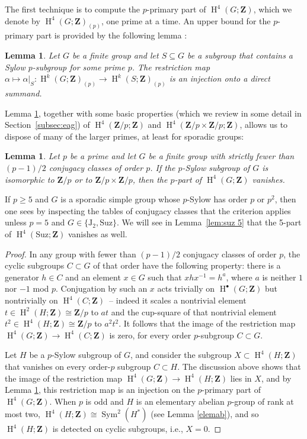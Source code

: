 \documentclass[pdftex]{sigma}
\numberwithin{equation}{section}
\newtheorem{Lemma}[Theorem]{Lemma}
\newcommand\bZ{\mathbf Z}
\DeclareMathOperator\homology{H}
\renewcommand\H{\homology}
\newcommand\<\langle
\renewcommand\>\rangle
\newcommand\Suz{\mathrm{Suz}}
\DeclareMathOperator\Sym{Sym}
\begin{document}
The first {technique is to compute}
 the $p$-primary part of $\H^4(G;\bZ)$, which we denote by $\H^4(G;\bZ)_{(p)}$, one prime at a time. An upper bound for the $p$-primary part is provided by the following lemma \cite[Section~XII.8]{MR0077480}:

\begin{Lemma}\label{transfer restriction}
Let $G$ be a finite group and let $S \subseteq G$ be a subgroup that contains a Sylow $p$-subgroup for some prime $p$. The {restriction} map $\alpha \mapsto \alpha|_S\colon \H^k(G;\bZ)_{(p)} \to \H^k(S;\bZ)_{(p)}$ is an injection onto a direct summand.
\end{Lemma}

Lemma \ref{transfer restriction}, together with some basic properties (which we review in some detail in Section~\ref{subsec:eag}) of $\H^4(\bZ/p;\bZ)$ and $\H^4(\bZ/p \times \bZ/p;\bZ)$, allows us to dispose of many of the larger primes, at least for sporadic groups:

\begin{Lemma}\label{large primes}Let $p$ be a prime and let $G$ be a finite group with strictly fewer than $(p-1)/2$ conjugacy classes of order $p$. If the $p$-Sylow subgroup of $G$ is isomorphic to $\bZ/p$ or to $\bZ/p \times \bZ/p$, then the $p$-part of $\H^4(G;\bZ)$ vanishes.
\end{Lemma}

If $p \geq 5$ and $G$ is a sporadic simple group whose $p$-Sylow has order $p$ or $p^2$, then one sees by inspecting the tables of conjugacy classes that the criterion applies unless $p = 5$ and $G \in \{\mathrm{J}_2,\mathrm{Suz}\}$. We will see in Lemma~\ref{lem:suz 5} that the 5-part of $\H^4(\Suz;\bZ)$ vanishes as well.

\begin{proof}In any group with fewer than $(p-1)/2$ conjugacy classes of order $p$, the cyclic subgroups $C \subset G$ of that order have the following property: there is a generator $h \in C$ and an element $x \in G$ such that $xhx^{-1} = h^a$, where $a$ is neither $1$ nor $-1$ mod $p$. Conjugation by such an $x$ acts trivially on $\H^\bullet(G;\bZ)$ but nontrivially on $\H^4(C;\bZ)$~-- indeed it scales a nontrivial element $t \in \H^2(H;\bZ) \cong \bZ/p$ to $at$ and the cup-square of that nontrivial element $t^2 \in \H^4(H;\bZ) \cong \bZ/p$ to $a^2 t^2$.
It follows that the image of the restriction map $\H^4(G;\bZ) \to \H^4(C;\bZ)$ is zero, for every order $p$-subgroup $C \subset G$.

Let $H$ be a $p$-Sylow subgroup of $G$, and consider the subgroup $X \subset \H^4(H;\bZ)$ that vanishes on every order-$p$ subgroup $C \subset H$. The discussion above shows that the image of the restriction map $\H^4(G;\bZ) \to \H^4(H;\bZ)$ lies in $X$, and by Lemma \ref{transfer restriction}, this restriction map is an injection on the $p$-primary part of $\H^4(G;\bZ)$. When $p$ is odd and $H$ is an elementary abelian $p$-group of rank at most two, $\H^4(H;\bZ) \cong \Sym^2(H^*)$ (see Lemma \ref{elemab}), and so $\H^4(H;\bZ)$ is detected on cyclic subgroups, i.e., $X = 0$.
\end{proof}
\end{document}
